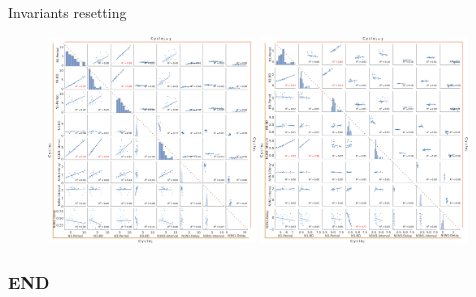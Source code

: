 \documentclass[aspectratio=43]{beamer}
\newcounter{mainframecount}
\begin{document}
\begin{frame}{Invariants resetting}
	
	\begin{figure}[htbp]
		\centering
		\includegraphics[width=0.49\textwidth]{./invariants/data/SUSSEX/MLN_driven/images/output_pairplot_reset_triangle.png}
		\includegraphics[width=0.49\textwidth]{./invariants/data/SUSSEX/CV1a_driven1/images/2phases/output_pairplot_reset_triangle.png}
	\end{figure}
\end{frame}

\begin{frame}
	\frametitle{END}
	\setcounter{framenumber}{\value{mainframecount}}  %

\end{frame}

\end{document}
